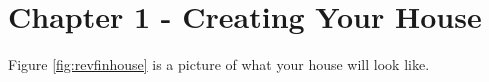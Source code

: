\documentclass{tufte-book} %
\begin{document}



\mainmatter


\chapter{Chapter 1 - Creating Your House}
\label{ch:1}
Figure \ref{fig:revfinhouse} is a picture of what your house will look like.


\begin{marginfigure}

\end{marginfigure}
\end{document}
